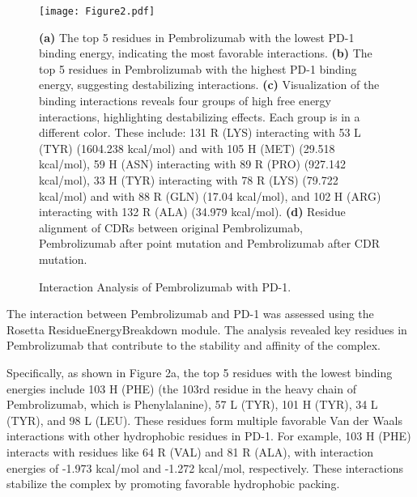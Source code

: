 \documentclass[11pt]{article}
\begin{document}
\begin{figure}[t]
\begin{center}
\texttt{[image: Figure2.pdf]}
\end{center}
\caption{Interaction Analysis of Pembrolizumab with PD-1.}
\textbf{(a)} The top 5 residues in Pembrolizumab with the lowest PD-1 binding energy, indicating the most favorable interactions. 
\textbf{(b)} The top 5 residues in Pembrolizumab with the highest PD-1 binding energy, suggesting destabilizing interactions. 
\textbf{(c)} Visualization of the binding interactions reveals four groups of high free energy interactions, highlighting destabilizing effects. Each group is in a different color. These include: 131 R (LYS) interacting with 53 L (TYR) (1604.238 kcal/mol) and with 105 H (MET) (29.518 kcal/mol), 59 H (ASN) interacting with 89 R (PRO) (927.142 kcal/mol), 33 H (TYR) interacting with 78 R (LYS) (79.722 kcal/mol) and with 88 R (GLN) (17.04 kcal/mol), and 102 H (ARG) interacting with 132 R (ALA) (34.979 kcal/mol).
\textbf{(d)} Residue alignment of CDRs between original Pembrolizumab, Pembrolizumab after point mutation and Pembrolizumab after CDR mutation.
\label{fig:fig2}
\end{figure}

The interaction between Pembrolizumab and PD-1 was assessed using the Rosetta ResidueEnergyBreakdown module. The analysis revealed key residues in Pembrolizumab that contribute to the stability and affinity of the complex. 

Specifically, as shown in Figure 2a, the top 5 residues with the lowest binding energies include 103 H (PHE) (the 103rd residue in the heavy chain of Pembrolizumab, which is Phenylalanine), 57 L (TYR), 101 H (TYR), 34 L (TYR), and 98 L (LEU). These residues form multiple favorable Van der Waals interactions with other hydrophobic residues in PD-1. For example, 103 H (PHE) interacts with residues like 64 R (VAL) and 81 R (ALA), with interaction energies of -1.973 kcal/mol and -1.272 kcal/mol, respectively. These interactions stabilize the complex by promoting favorable hydrophobic packing.
\end{document}
